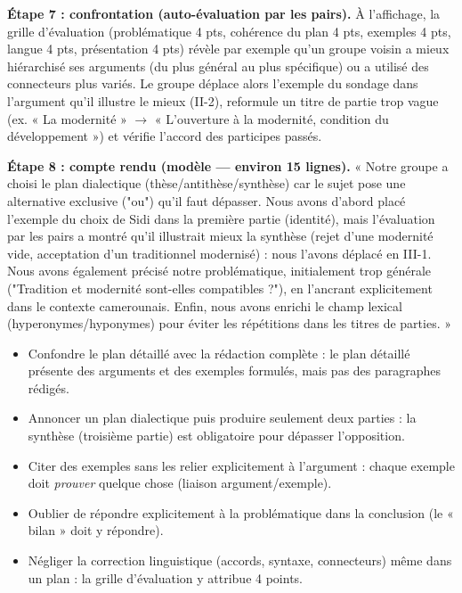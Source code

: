 \documentclass[11pt]{article}
\begin{document}
\begin{exoresolu}
\textbf{Étape 7 : confrontation (auto-évaluation par les pairs).} À l'affichage, la grille d'évaluation (problématique 4 pts, cohérence du plan 4 pts, exemples 4 pts, langue 4 pts, présentation 4 pts) révèle par exemple qu'un groupe voisin a mieux hiérarchisé ses arguments (du plus général au plus spécifique) ou a utilisé des connecteurs plus variés. Le groupe déplace alors l'exemple du sondage dans l'argument qu'il illustre le mieux (II-2), reformule un titre de partie trop vague (ex. « La modernité » $\rightarrow$ « L'ouverture à la modernité, condition du développement ») et vérifie l'accord des participes passés.

\textbf{Étape 8 : compte rendu (modèle — environ 15 lignes).}
« Notre groupe a choisi le plan dialectique (thèse/antithèse/synthèse) car le sujet pose une alternative exclusive ("ou") qu'il faut dépasser. Nous avons d'abord placé l'exemple du choix de Sidi dans la première partie (identité), mais l'évaluation par les pairs a montré qu'il illustrait mieux la synthèse (rejet d'une modernité vide, acceptation d'un traditionnel modernisé) : nous l'avons déplacé en III-1. Nous avons également précisé notre problématique, initialement trop générale ("Tradition et modernité sont-elles compatibles ?"), en l'ancrant explicitement dans le contexte camerounais. Enfin, nous avons enrichi le champ lexical (hyperonymes/hyponymes) pour éviter les répétitions dans les titres de parties. »
\end{exoresolu}

\begin{attention}
\begin{itemize}
\item Confondre le plan détaillé avec la rédaction complète : le plan détaillé présente des arguments et des exemples formulés, mais pas des paragraphes rédigés.
\item Annoncer un plan dialectique puis produire seulement deux parties : la synthèse (troisième partie) est obligatoire pour dépasser l'opposition.
\item Citer des exemples sans les relier explicitement à l'argument : chaque exemple doit \emph{prouver} quelque chose (liaison argument/exemple).
\item Oublier de répondre explicitement à la problématique dans la conclusion (le « bilan » doit y répondre).
\item Négliger la correction linguistique (accords, syntaxe, connecteurs) même dans un plan : la grille d'évaluation y attribue 4 points.
\end{itemize}
\end{attention}
\end{document}
